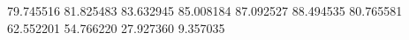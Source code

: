 79.745516
81.825483
83.632945
85.008184
87.092527
88.494535
80.765581
62.552201
54.766220
27.927360
9.357035
